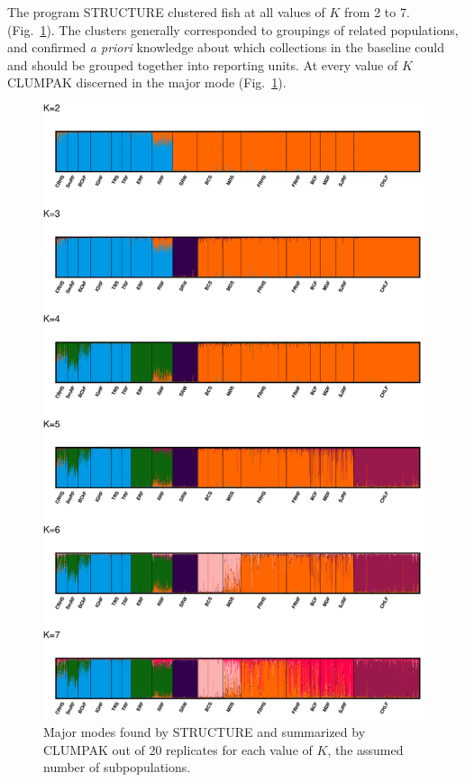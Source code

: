 The program STRUCTURE clustered fish at all values of $K$ from 2 to 7.
(Fig.~\ref{fig:struct}).  The clusters generally corresponded to groupings of related populations, and confirmed
{\em a priori} knowledge about which collections in the baseline could and should be
grouped together into reporting units.  At every value of $K$ CLUMPAK discerned  in the major mode (Fig.~\ref{fig:struct}).   
\begin{figure}
\newcommand{\structcap}{\footnotesize Major modes found by STRUCTURE and summarized
by CLUMPAK out of 20 replicates for each value of $K$, the assumed number of
subpopulations. }
\begin{center}
\includegraphics[width=\columnwidth]{images/clumpak-crop.pdf}
\end{center}
\caption[\structcap]{\structcap}
\label{fig:struct}
\end{figure}


